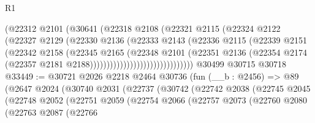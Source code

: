 \begin{lexlean}{R1}
\begin{coremodule}
                                  (@22312
                                    @2101
                                    (@30641
                                      (@22318
                                        @2108
                                        (@22321
                                          @2115
                                          (@22324
                                            @2122
                                            (@22327
                                              @2129
                                              (@22330
                                                @2136
                                                (@22333
                                                  @2143
                                                  (@22336
                                                    @2115
                                                    (@22339
                                                      @2151
                                                      (@22342
                                                        @2158
                                                        (@22345
                                                          @2165
                                                          (@22348
                                                            @2101
                                                            (@22351
                                                              @2136
                                                              (@22354
                                                                @2174
                                                                (@22357
                                                                  @2181
                                                                  @2188)))))))))))))))))))))))))))))))
    @30499
    @30715
    @30718
@33449 := @30721
    @2026
    @2218
    @2464
    @30736
    (fun (__b : @2456) =>
    @89
      (@2647
        @2024
        (@30740
          @2031
          (@22737
            (@30742
              (@22742
                @2038
                (@22745
                  @2045
                  (@22748
                    @2052
                    (@22751
                      @2059
                      (@22754
                        @2066
                        (@22757
                          @2073
                          (@22760
                            @2080
                            (@22763
                              @2087
                              (@22766

\end{coremodule}
\end{lexlean}
